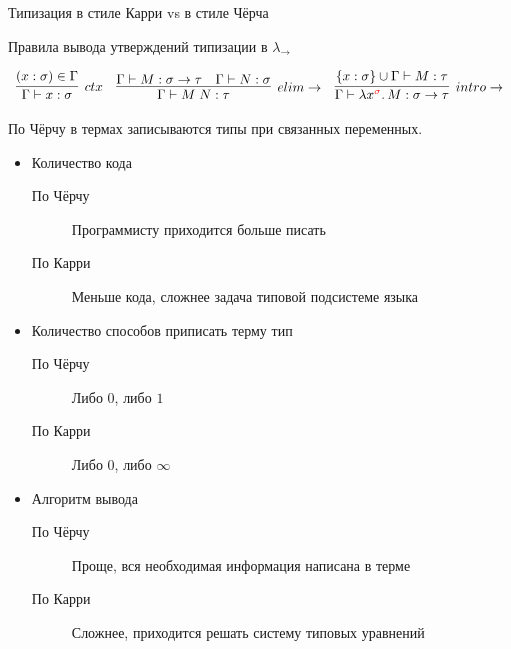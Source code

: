     \begin{frame}{Типизация в стиле Карри vs {\color{red} в стиле Чёрча}}
        \begin{block}{Правила вывода утверждений типизации в $\lambda_{\rightarrow}$}
            \vspace{-1em}
            \begin{center}
                \[
                    \begin{array}{l c r}
                        \infer[ctx]{\Gamma \vdash x: \sigma}{(x: \sigma) \in \Gamma}
                        &
                        \infer[elim\to]{\Gamma \vdash M\;N : \tau}{\Gamma \vdash M : \sigma \to \tau & \Gamma \vdash N : \sigma}
                        &
                        \infer[intro\to]{\Gamma \vdash \lambda x^{\color{red} \sigma}\ldotp M : \sigma \to \tau}{\{x : \sigma\} \cup \Gamma \vdash M : \tau}
                    \end{array}
                \]
            \end{center}
        \end{block}
        \vspace{1em}
        По Чёрчу в термах записываются типы при связанных переменных.
        \begin{itemize}
            \item Количество кода
            \begin{description}
                \item[По Чёрчу] Программисту приходится больше писать
                \item[По Карри] Меньше кода, сложнее задача типовой подсистеме языка
            \end{description}
            \item Количество способов приписать терму тип
            \begin{description}
                \item[По Чёрчу] Либо $0$, либо $1$
                \item[По Карри] Либо $0$, либо $\infty$
            \end{description}
            \item Алгоритм вывода
            \begin{description}
                \item[По Чёрчу] Проще, вся необходимая информация написана в терме
                \item[По Карри] Сложнее, приходится решать систему типовых уравнений
            \end{description}
        \end{itemize}
    \end{frame}



